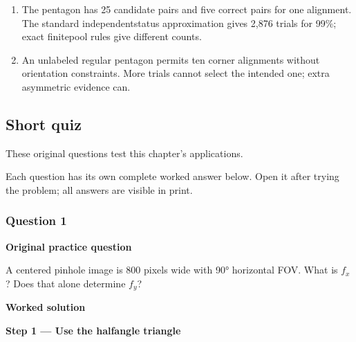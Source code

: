 \documentclass[letterpaper,11pt,english,openany,oneside]{jupyterBook}
\begin{document}
\begin{enumerate}
\item {}
\sphinxAtStartPar
{} The pentagon has 25 candidate pairs and five correct pairs for one alignment. The standard independent\sphinxhyphen{}status approximation gives 2,876 trials for 99\%; exact finite\sphinxhyphen{}pool rules give different counts.

\item {}
\sphinxAtStartPar
{} An unlabeled regular pentagon permits ten corner alignments without orientation constraints. More trials cannot select the intended one; extra asymmetric evidence can.

\end{enumerate}

\newpage


\subsection{Short quiz}
\label{\detokenize{lectures/lecture03/tldr:short-quiz}}
\sphinxAtStartPar
These original questions test this chapter’s applications.

\sphinxAtStartPar
Each question has its own complete worked answer below. Open it after trying the problem; all answers are visible in print.


\subsubsection{Question 1}
\label{\detokenize{lectures/lecture03/tldr:question-1}}\label{\detokenize{lectures/lecture03/tldr:lec03-tldr-q1}}
\par\medskip\textbf{Original practice question}\par\smallskip

\sphinxAtStartPar
A centered pinhole image is 800 pixels wide with 90° horizontal FOV. What is \(f_x\)? Does that alone determine \(f_y\)?

\par\medskip

\par\medskip
\textbf{Worked solution}\par\smallskip

\par\medskip{}
{\color{QuizStepRed}\bfseries Step 1 — Use the half\sphinxhyphen{}angle triangle}\par\smallskip
\end{document}

